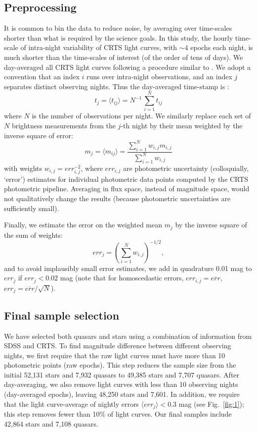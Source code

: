 \documentclass[fleqn,usenatbib]{mnras}
\begin{document}
\subsection{Preprocessing}
\label{sec:preprocessing}
It is common to bin the data to reduce noise, by averaging over time-scales shorter than what is required by the science goals. In this study, the hourly time-scale of intra-night variability of CRTS light curves, with $\sim4$ epochs each night, is much shorter than the time-scales of interest (of the order of tens of days).  We day-averaged all CRTS light curves following a procedure similar to \cite{charisi2016}. We adopt a convention that an index  $i$ runs over intra-night observations, and an index $j$ separates distinct observing nights. Thus the day-averaged time-stamp is : 
\begin{equation}
t_{j} = \langle t_{ij} \rangle =  N^{-1} \, \sum_{i=1}^{N}{ t_{ij} }
\end{equation}
where $N$ is the number of observations per night. We similarly replace each set of $N$ brightness measurements from the  $j$-th  night by their mean weighted by the inverse square of error:
\begin{equation}
\label{eq:1}
 m_{j} = \langle m_{ij} \rangle = \frac{\sum_{i=1}^{N} {w_{i,j} m_{i,j}} } {\sum_{i=1}^{N} {w_{i,j}} }
\end{equation}
with weights $w_{i,j} = err_{i,j}^{-2}$, where $err_{i,j}$ are photometric uncertainty (colloquially, `error') estimates
for individual photometric data points computed by the CRTS photometric pipeline. Averaging in 
flux space, instead of magnitude space, would not qualitatively change the results (because photometric 
uncertainties are sufficiently small). 

Finally, we estimate the error on the weighted mean $m_{j}$ by the inverse square of the sum of weights:  
\begin{equation}
\label{eq:2}
err_{j} = \left(\sum_{i=1}^{N} {w_{i,j}}\right)^{-1/2}, 
\end{equation} 
and to avoid implausibly small error estimates, we add in quadrature 0.01 mag to $err_{j}$ if $err_{j} < 0.02$ mag
(note that for homoscedastic errors, $err_{i,j}=\overline{err}$, $err_j = \overline{err}/\sqrt{N}$). 


\subsection{Final sample selection}

We have selected both quasars and stars using a combination of information from SDSS and CRTS. 
To find magnitude difference between different observing nights, we first require that the raw light curves
must have more than 10 photometric points (raw epochs). This step reduces the sample size from the initial 52,131 stars and 7,932 
quasars to 49,385 stars and 7,707 quasars. After day-averaging, we also remove light curves with less than 10 
observing nights (day-averaged epochs), leaving 48,250 stars and 7,601. In addition, we require that the light curve-average 
of nightly errors $\langle err_{j} \rangle < 0.3$ mag (see Fig.~\ref{fig:1}); this step removes
fewer than 10\% of light curves. Our final samples include 42,864 stars and 7,108 quasars. 
\end{document}
